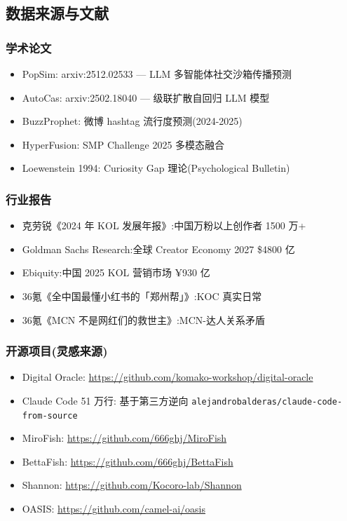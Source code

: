 
\subsection{数据来源与文献}

\subsubsection{学术论文}

\begin{itemize}
\item PopSim: arxiv:2512.02533 — LLM 多智能体社交沙箱传播预测
\item AutoCas: arxiv:2502.18040 — 级联扩散自回归 LLM 模型
\item BuzzProphet: 微博 hashtag 流行度预测(2024-2025)
\item HyperFusion: SMP Challenge 2025 多模态融合
\item Loewenstein 1994: Curiosity Gap 理论(Psychological Bulletin)
\end{itemize}

\subsubsection{行业报告}

\begin{itemize}
\item 克劳锐《2024 年 KOL 发展年报》:中国万粉以上创作者 1500 万+
\item Goldman Sachs Research:全球 Creator Economy 2027 \$4800 亿
\item Ebiquity:中国 2025 KOL 营销市场 ¥930 亿
\item 36氪《全中国最懂小红书的「郑州帮」》:KOC 真实日常
\item 36氪《MCN 不是网红们的救世主》:MCN-达人关系矛盾
\end{itemize}

\subsubsection{开源项目(灵感来源)}

\begin{itemize}
\item Digital Oracle: \url{https://github.com/komako-workshop/digital-oracle}
\item Claude Code 51 万行: 基于第三方逆向 \texttt{alejandrobalderas/claude-code-from-source}
\item MiroFish: \url{https://github.com/666ghj/MiroFish}
\item BettaFish: \url{https://github.com/666ghj/BettaFish}
\item Shannon: \url{https://github.com/Kocoro-lab/Shannon}
\item OASIS: \url{https://github.com/camel-ai/oasis}
\end{itemize}

